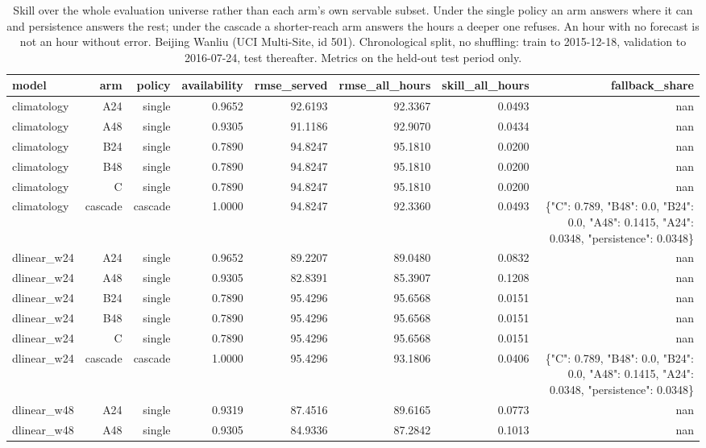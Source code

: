 \begin{table}[htbp]
\caption{Skill over the whole evaluation universe rather than each arm's own servable subset. Under the single policy an arm answers where it can and persistence answers the rest; under the cascade a shorter-reach arm answers the hours a deeper one refuses. An hour with no forecast is not an hour without error. Beijing Wanliu (UCI Multi-Site, id 501). Chronological split, no shuffling: train to 2015-12-18, validation to 2016-07-24, test thereafter. Metrics on the held-out test period only.}
\label{tab:lookback_all_hours}
\begin{tabular}{lrrrrrrr}
\toprule
model & arm & policy & availability & rmse\_served & rmse\_all\_hours & skill\_all\_hours & fallback\_share \\
\midrule
climatology & A24 & single & 0.9652 & 92.6193 & 92.3367 & 0.0493 & nan \\
climatology & A48 & single & 0.9305 & 91.1186 & 92.9070 & 0.0434 & nan \\
climatology & B24 & single & 0.7890 & 94.8247 & 95.1810 & 0.0200 & nan \\
climatology & B48 & single & 0.7890 & 94.8247 & 95.1810 & 0.0200 & nan \\
climatology & C & single & 0.7890 & 94.8247 & 95.1810 & 0.0200 & nan \\
climatology & cascade & cascade & 1.0000 & 94.8247 & 92.3360 & 0.0493 & \{"C": 0.789, "B48": 0.0, "B24": 0.0, "A48": 0.1415, "A24": 0.0348, "persistence": 0.0348\} \\
dlinear\_w24 & A24 & single & 0.9652 & 89.2207 & 89.0480 & 0.0832 & nan \\
dlinear\_w24 & A48 & single & 0.9305 & 82.8391 & 85.3907 & 0.1208 & nan \\
dlinear\_w24 & B24 & single & 0.7890 & 95.4296 & 95.6568 & 0.0151 & nan \\
dlinear\_w24 & B48 & single & 0.7890 & 95.4296 & 95.6568 & 0.0151 & nan \\
dlinear\_w24 & C & single & 0.7890 & 95.4296 & 95.6568 & 0.0151 & nan \\
dlinear\_w24 & cascade & cascade & 1.0000 & 95.4296 & 93.1806 & 0.0406 & \{"C": 0.789, "B48": 0.0, "B24": 0.0, "A48": 0.1415, "A24": 0.0348, "persistence": 0.0348\} \\
dlinear\_w48 & A24 & single & 0.9319 & 87.4516 & 89.6165 & 0.0773 & nan \\
dlinear\_w48 & A48 & single & 0.9305 & 84.9336 & 87.2842 & 0.1013 & nan \\

\end{tabular}
\end{table}
